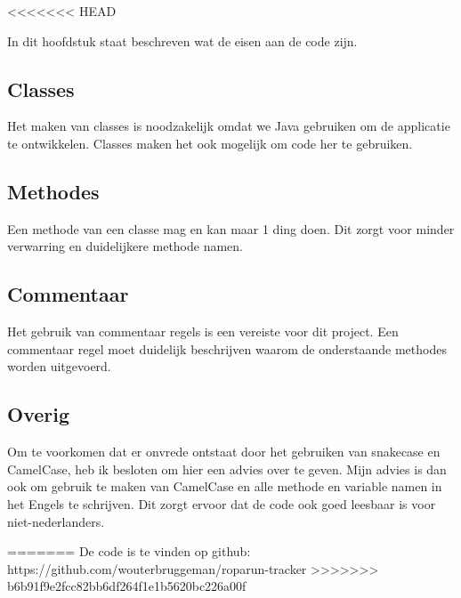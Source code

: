 \documentclass[../main.tex]{subfiles}
\begin{document}
<<<<<<< HEAD

In dit hoofdstuk staat beschreven wat de eisen aan de code zijn.

\subsection{Classes}
Het maken van classes is noodzakelijk omdat we Java gebruiken om de applicatie te ontwikkelen.
Classes maken het ook mogelijk om code her te gebruiken.

\subsection{Methodes}
Een methode van een classe mag en kan maar 1 ding doen.
Dit zorgt voor minder verwarring en duidelijkere methode namen.
\newline

\subsection{Commentaar}
Het gebruik van commentaar regels is een vereiste voor dit project. Een commentaar regel
moet duidelijk beschrijven waarom de onderstaande methodes worden uitgevoerd.
\newline

\subsection{Overig}
Om te voorkomen dat er onvrede ontstaat door het gebruiken van snakecase en CamelCase,
heb ik besloten om hier een advies over te geven.
\newline
Mijn advies is dan ook om gebruik te maken van CamelCase en alle methode en variable
namen in het Engels te schrijven. Dit zorgt ervoor dat de code ook goed leesbaar is voor
niet-nederlanders.

=======
    De code is te vinden op github:
    https://github.com/wouterbruggeman/roparun-tracker
>>>>>>> b6b91f9e2fcc82bb6df264f1e1b5620bc226a00f
\end{document}
